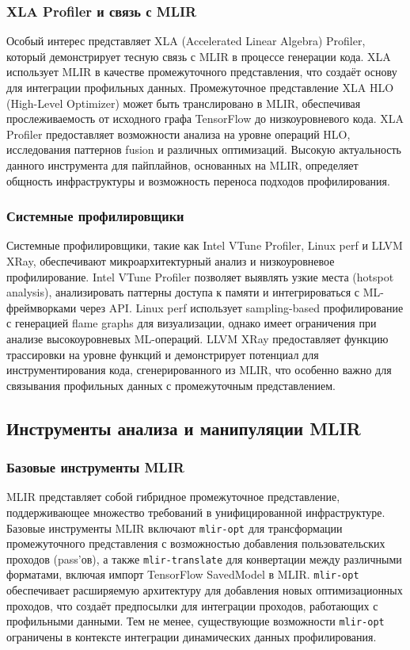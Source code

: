 \subsubsection{XLA Profiler и связь с MLIR}
Особый интерес представляет XLA (Accelerated Linear Algebra) Profiler, который демонстрирует тесную связь с MLIR в процессе генерации кода. XLA использует MLIR в качестве промежуточного представления, что создаёт основу для интеграции профильных данных. Промежуточное представление XLA HLO (High-Level Optimizer) может быть транслировано в MLIR, обеспечивая прослеживаемость от исходного графа TensorFlow до низкоуровневого кода.
XLA Profiler предоставляет возможности анализа на уровне операций HLO, исследования паттернов fusion и различных оптимизаций. Высокую актуальность данного инструмента для пайплайнов, основанных на MLIR, определяет общность инфраструктуры и возможность переноса подходов профилирования.

\subsubsection{Системные профилировщики}
Системные профилировщики, такие как Intel VTune Profiler, Linux perf и LLVM XRay, обеспечивают микроархитектурный анализ и низкоуровневое профилирование. Intel VTune Profiler позволяет выявлять узкие места (hotspot analysis), анализировать паттерны доступа к памяти и интегрироваться с ML-фреймворками через API. Linux perf использует sampling-based профилирование с генерацией flame graphs для визуализации, однако имеет ограничения при анализе высокоуровневых ML-операций.
LLVM XRay предоставляет функцию трассировки на уровне функций и демонстрирует потенциал для инструментирования кода, сгенерированного из MLIR, что особенно важно для связывания профильных данных с промежуточным представлением.

\subsection{Инструменты анализа и манипуляции MLIR}

\subsubsection{Базовые инструменты MLIR}
MLIR \cite{mlir_main} представляет собой гибридное промежуточное представление, поддерживающее множество требований в унифицированной инфраструктуре. Базовые инструменты MLIR включают \texttt{mlir-opt} для трансформации промежуточного представления с возможностью добавления пользовательских проходов (pass’ов), а также \texttt{mlir-translate} для конвертации между различными форматами, включая импорт TensorFlow SavedModel в MLIR.
\texttt{mlir-opt} обеспечивает расширяемую архитектуру для добавления новых оптимизационных проходов, что создаёт предпосылки для интеграции проходов, работающих с профильными данными. Тем не менее, существующие возможности \texttt{mlir-opt} ограничены в контексте интеграции динамических данных профилирования.

